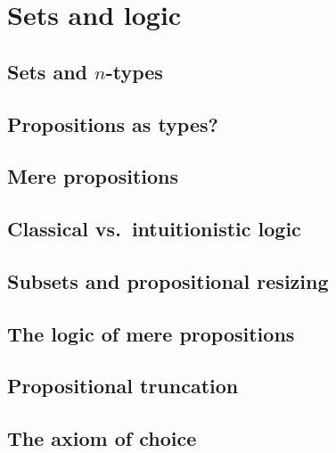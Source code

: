 \chapter{Sets and logic}
\label{cha:logic}


\section{Sets and \texorpdfstring{$n$}{n}-types}
\label{sec:basics-sets}


\section{Propositions as types?}
\label{subsec:pat?}


\section{Mere propositions}
\label{subsec:hprops}


\section{Classical vs.\ intuitionistic logic}
\label{sec:intuitionism}


\section{Subsets and propositional resizing}
\label{subsec:prop-subsets}


\section{The logic of mere propositions}
\label{subsec:logic-hprop}


\section{Propositional truncation}
\label{subsec:prop-trunc}


\section{The axiom of choice}
\label{sec:axiom-choice}


